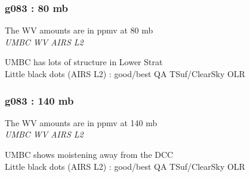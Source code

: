 \documentclass[10pt,t]{beamer}
\begin{document}
\begin{frame}
\frametitle{g083 : 80 mb}
The WV amounts are in ppmv at 80 mb\\
\hspace{0.5in} \emph{UMBC WV}  \hspace{2.0in} \emph{AIRS L2} \\
\begin{center}
\end{center}
UMBC has lots of structure in Lower Strat \\
Little black dots (AIRS L2) : good/best QA TSuf/ClearSky OLR
\end{frame}

\begin{frame}
\frametitle{g083 : 140 mb}
The WV amounts are in ppmv at 140 mb\\
\hspace{0.5in} \emph{UMBC WV}  \hspace{2.0in} \emph{AIRS L2} \\
\begin{center}
\end{center}
UMBC shows moistening away from the DCC \\
Little black dots (AIRS L2) : good/best QA TSuf/ClearSky OLR
\end{frame}
\end{document}
